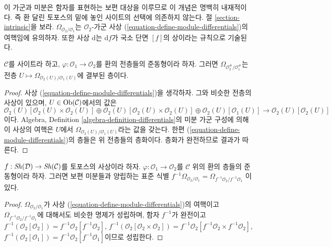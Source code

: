 \noindent
이 가군과 미분은 함자를 표현하는 보편 대상을 이루므로 이 개념은 명백히
내재적이다. 즉 환 달린 토포스의 밑에 놓인 사이트의 선택에 의존하지 않는다.
절 \ref{section-intrinsic}을 보라.
$\Omega_{\mathcal{O}_2/\mathcal{O}_1}$는 $\mathcal{O}_2$-가군 사상
(\ref{equation-define-module-differentials})의 여핵임에 유의하자. 또한 사상
$\text{d}$는 $\text{d}f$가 국소 단면 $[f]$의 상이라는 규칙으로 기술된다.

\begin{lemma}
\label{lemma-differentials-sheafify}
$\mathcal{C}$를 사이트라 하고, $\varphi : \mathcal{O}_1 \to \mathcal{O}_2$를
환의 전층들의 준동형이라 하자. 그러면
$\Omega_{\mathcal{O}_2^\#/\mathcal{O}_1^\#}$는 전층
$U \mapsto \Omega_{\mathcal{O}_2(U)/\mathcal{O}_1(U)}$에 결부된 층이다.
\end{lemma}

\begin{proof}
사상 (\ref{equation-define-module-differentials})을 생각하자. 그와 비슷한
전층의 사상이 있으며, $U \in \mathop{\mathrm{Ob}}\nolimits(\mathcal{C})$에서의 값은
$$
\mathcal{O}_2(U)[\mathcal{O}_2(U) \times \mathcal{O}_2(U)] \oplus
\mathcal{O}_2(U)[\mathcal{O}_2(U) \times \mathcal{O}_2(U)] \oplus
\mathcal{O}_2(U)[\mathcal{O}_1(U)]
\longrightarrow
\mathcal{O}_2(U)[\mathcal{O}_2(U)]
$$
이다. Algebra, Definition \ref{algebra-definition-differentials}의 미분 가군
구성에 의해 이 사상의 여핵은 $U$에서
$\Omega_{\mathcal{O}_2(U)/\mathcal{O}_1(U)}$라는 값을 갖는다.
한편 (\ref{equation-define-module-differentials})의 층들은 위 전층들의
층화이다. 층화가 완전하므로 결과가 따른다.
\end{proof}

\begin{lemma}
\label{lemma-pullback-differentials}
$f : \mathop{\mathit{Sh}}\nolimits(\mathcal{D}) \to \mathop{\mathit{Sh}}\nolimits(\mathcal{C})$를 토포스의 사상이라 하자.
$\varphi : \mathcal{O}_1 \to \mathcal{O}_2$를 $\mathcal{C}$ 위의
환의 층들의 준동형이라 하자. 그러면 보편 미분들과 양립하는 표준 식별
$f^{-1}\Omega_{\mathcal{O}_2/\mathcal{O}_1} =
\Omega_{f^{-1}\mathcal{O}_2/f^{-1}\mathcal{O}_1}$
이 있다.
\end{lemma}

\begin{proof}
$\Omega_{\mathcal{O}_2/\mathcal{O}_1}$가 사상
(\ref{equation-define-module-differentials})의 여핵이고
$\Omega_{f^{-1}\mathcal{O}_2/f^{-1}\mathcal{O}_1}$에 대해서도
비슷한 명제가 성립하며, 함자 $f^{-1}$가 완전이고
$f^{-1}(\mathcal{O}_2[\mathcal{O}_2]) =
f^{-1}\mathcal{O}_2[f^{-1}\mathcal{O}_2]$,
$f^{-1}(\mathcal{O}_2[\mathcal{O}_2 \times \mathcal{O}_2]) =
f^{-1}\mathcal{O}_2[f^{-1}\mathcal{O}_2 \times f^{-1}\mathcal{O}_2]$,
$f^{-1}(\mathcal{O}_2[\mathcal{O}_1]) =
f^{-1}\mathcal{O}_2[f^{-1}\mathcal{O}_1]$이므로 성립한다.
\end{proof}

